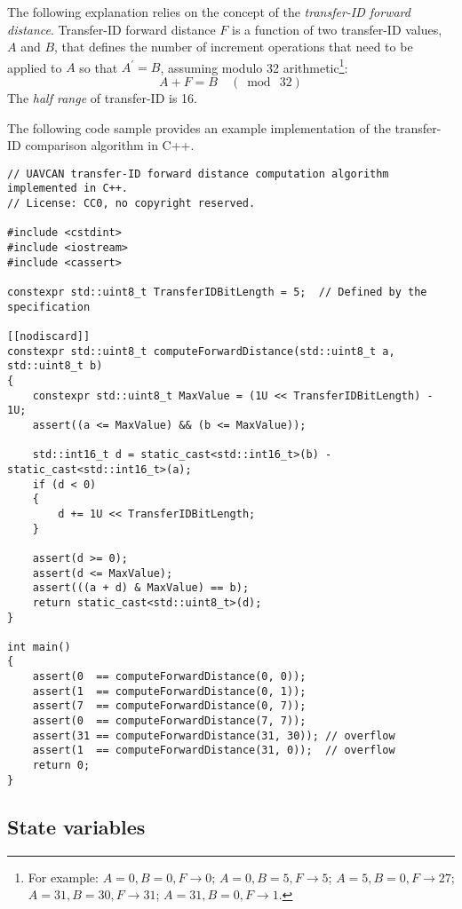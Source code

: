 The following explanation relies on the concept of the \emph{transfer-ID forward distance}.
Transfer-ID forward distance $F$ is a function of two transfer-ID values,
$A$ and $B$, that defines the number of increment operations that need to be applied to
$A$ so that $A^\prime{} = B$, assuming modulo 32 arithmetic\footnote{%
    For example:
    $A=0, B=0, F\rightarrow0$;
    $A=0, B=5, F\rightarrow5$;
    $A=5, B=0, F\rightarrow27$;
    $A=31, B=30, F\rightarrow31$;
    $A=31, B=0, F\rightarrow1$.
}:
$$A + F = B \quad (\bmod{}\ 32)$$
The \emph{half range} of transfer-ID is 16.

The following code sample provides an example implementation of the transfer-ID comparison algorithm in C++.

\begin{minipage}{0.9\textwidth}  %
\begin{verbatim}
// UAVCAN transfer-ID forward distance computation algorithm implemented in C++.
// License: CC0, no copyright reserved.

#include <cstdint>
#include <iostream>
#include <cassert>

constexpr std::uint8_t TransferIDBitLength = 5;  // Defined by the specification

[[nodiscard]]
constexpr std::uint8_t computeForwardDistance(std::uint8_t a, std::uint8_t b)
{
    constexpr std::uint8_t MaxValue = (1U << TransferIDBitLength) - 1U;
    assert((a <= MaxValue) && (b <= MaxValue));

    std::int16_t d = static_cast<std::int16_t>(b) - static_cast<std::int16_t>(a);
    if (d < 0)
    {
        d += 1U << TransferIDBitLength;
    }

    assert(d >= 0);
    assert(d <= MaxValue);
    assert(((a + d) & MaxValue) == b);
    return static_cast<std::uint8_t>(d);
}

int main()
{
    assert(0  == computeForwardDistance(0, 0));
    assert(1  == computeForwardDistance(0, 1));
    assert(7  == computeForwardDistance(0, 7));
    assert(0  == computeForwardDistance(7, 7));
    assert(31 == computeForwardDistance(31, 30)); // overflow
    assert(1  == computeForwardDistance(31, 0));  // overflow
    return 0;
}
\end{verbatim}
\end{minipage}

\subsection{State variables}

